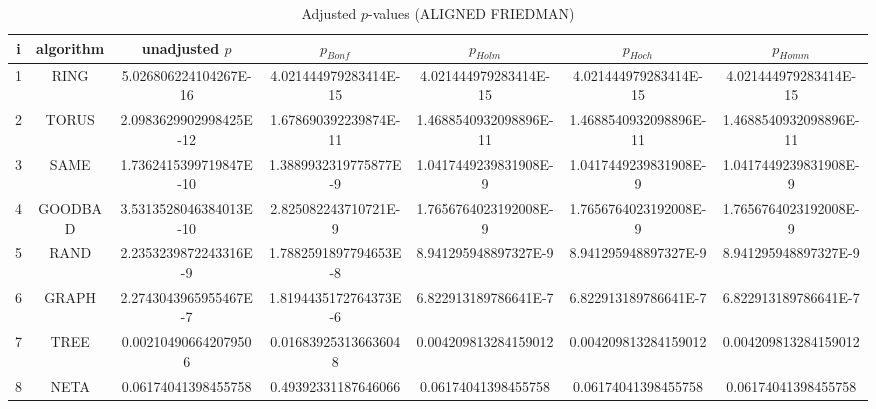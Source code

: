 \documentclass[a4paper,10pt]{article}
\begin{document}
\begin{landscape}
\begin{table}[!htp]
\centering\scriptsize
\caption{Adjusted $p$-values (ALIGNED FRIEDMAN)}
\begin{tabular}{ccccccc}
i&algorithm&unadjusted $p$&$p_{Bonf}$&$p_{Holm}$&$p_{Hoch}$&$p_{Homm}$\\
\hline
1& RING&5.026806224104267E-16&4.021444979283414E-15&4.021444979283414E-15&4.021444979283414E-15&4.021444979283414E-15\\
2& TORUS&2.0983629902998425E-12&1.678690392239874E-11&1.4688540932098896E-11&1.4688540932098896E-11&1.4688540932098896E-11\\
3& SAME&1.7362415399719847E-10&1.3889932319775877E-9&1.0417449239831908E-9&1.0417449239831908E-9&1.0417449239831908E-9\\
4& GOODBAD&3.5313528046384013E-10&2.825082243710721E-9&1.7656764023192008E-9&1.7656764023192008E-9&1.7656764023192008E-9\\
5& RAND&2.2353239872243316E-9&1.7882591897794653E-8&8.941295948897327E-9&8.941295948897327E-9&8.941295948897327E-9\\
6& GRAPH&2.2743043965955467E-7&1.8194435172764373E-6&6.822913189786641E-7&6.822913189786641E-7&6.822913189786641E-7\\
7& TREE&0.002104906642079506&0.016839253136636048&0.004209813284159012&0.004209813284159012&0.004209813284159012\\
8& NETA&0.06174041398455758&0.49392331187646066&0.06174041398455758&0.06174041398455758&0.06174041398455758\\
\hline
\end{tabular}
\end{table}


\end{landscape}
\end{document}
